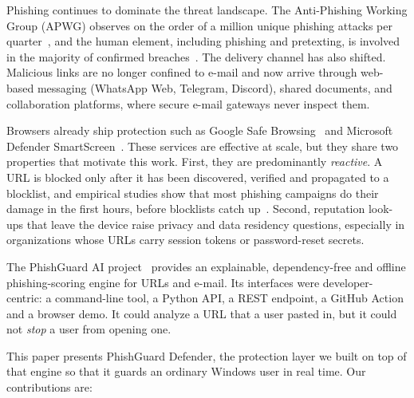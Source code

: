 \documentclass[conference]{IEEEtran}
\newcommand{\sys}{PhishGuard Defender}
\begin{document}
Phishing continues to dominate the threat landscape. The Anti-Phishing Working
Group (APWG) observes on the order of a million unique phishing attacks per
quarter~\cite{apwg2024}, and the human element, including phishing and
pretexting, is involved in the majority of confirmed breaches~\cite{verizon2024}.
The delivery channel has also shifted. Malicious links are no longer confined
to e-mail and now arrive through web-based messaging (WhatsApp Web, Telegram,
Discord), shared documents, and collaboration platforms, where secure e-mail
gateways never inspect them.

Browsers already ship protection such as Google Safe Browsing~\cite{gsb} and
Microsoft Defender SmartScreen~\cite{smartscreen}. These services are
effective at scale, but they share two properties that motivate this work.
First, they are predominantly \emph{reactive}. A URL is blocked only after it
has been discovered, verified and propagated to a blocklist, and empirical
studies show that most phishing campaigns do their damage in the first hours,
before blocklists catch up~\cite{sheng2009,oest2019phishfarm,oest2020sunrise}.
Second, reputation look-ups that leave the device raise privacy and data
residency questions, especially in organizations whose URLs carry session
tokens or password-reset secrets.

The PhishGuard AI project~\cite{phishguardai} provides an explainable,
dependency-free and offline phishing-scoring engine for URLs and e-mail. Its
interfaces were developer-centric: a command-line tool, a Python API, a REST
endpoint, a GitHub Action and a browser demo. It could analyze a URL that a
user pasted in, but it could not \emph{stop} a user from opening one.

This paper presents \sys{}, the protection layer we built on top of that
engine so that it guards an ordinary Windows user in real time. Our
contributions are:
\end{document}
